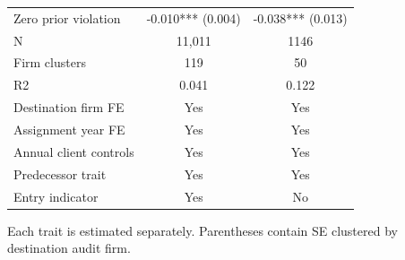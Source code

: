 \begin{table}[!htbp]
{\begin{tabular}{lcc}
Zero prior violation & -0.010*** (0.004) & -0.038*** (0.013) \\
N & 11,011 & 1146 \\
Firm clusters & 119 & 50 \\
R2 & 0.041 & 0.122 \\
Destination firm FE & Yes & Yes \\
Assignment year FE & Yes & Yes \\
Annual client controls & Yes & Yes \\
Predecessor trait & Yes & Yes \\
Entry indicator & Yes & No \\
\bottomrule
\end{tabular}}
\begin{minipage}{\textwidth}\footnotesize Each trait is estimated separately. Parentheses contain SE clustered by destination audit firm.\end{minipage}
\end{table}
